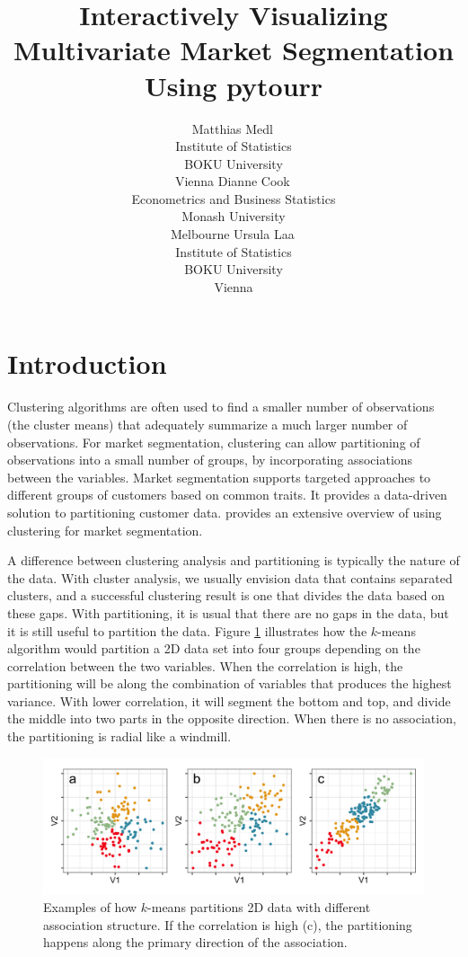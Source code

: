 \documentclass[article]{ajs}
\author{Matthias Medl\,\orcidlink{0000-0002-3354-4579}\\ Institute of Statistics \\ BOKU University \\ Vienna \And 
        Dianne Cook\,\orcidlink{0000-0002-3813-7155}\\ Econometrics and Business Statistics \\ Monash University \\ Melbourne \And
        Ursula Laa\,\orcidlink{0000-0002-0249-6439}\\ Institute of Statistics \\ BOKU University \\ Vienna}
\title{Interactively Visualizing Multivariate Market Segmentation Using pytourr}
\begin{document}
\section{Introduction}

Clustering algorithms are often used to find a smaller number of observations (the cluster means) that adequately summarize a much larger number of observations. For market segmentation, clustering can allow partitioning of observations into a small number of groups, by incorporating associations between the variables. Market segmentation supports targeted approaches to different groups of customers based on common traits.  It provides a data-driven solution to partitioning customer data. \cite{leisch2018market} provides an extensive overview of using clustering for market segmentation. 

A difference between clustering analysis and partitioning is typically the nature of the data. With cluster analysis, we usually envision data that contains separated clusters, and a successful clustering result is one that divides the data based on these gaps. With partitioning, it is usual that there are no gaps in the data, but it is still useful to partition the data. Figure \ref{kmeans-partition} illustrates how the $k$-means algorithm would partition a 2D data set into four groups depending on the correlation between the two variables.  When the correlation is high, the partitioning will be along the combination of variables that produces the highest variance. With lower correlation, it will segment the bottom and top, and divide the middle into two parts in the opposite direction. When there is no association, the partitioning is radial like a windmill.

\begin{figure}[h]
\centerline{\includegraphics[width=1\textwidth]{images/intro1.png}}
\caption{Examples of how $k$-means partitions 2D data with different association structure. If the correlation is high (c), the partitioning happens along the primary direction of the association.}
\label{kmeans-partition}
\end{figure}
\end{document}
